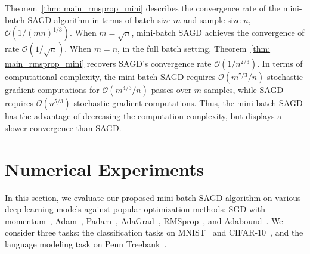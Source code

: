 \documentclass[11pt]{article}
\begin{document}
Theorem~\ref{thm: main_rmsprop_mini} 
describes the convergence rate of the mini-batch \textsc{SAGD} algorithm in terms of batch size $m$ and sample size $n$, \ie $\mathcal{O}(1/(mn)^{1/3})$.
When $m = \sqrt{n}$, mini-batch \textsc{SAGD} achieves the convergence of rate $\mathcal{O}(1/\sqrt{n})$. When $m=n$, \ie in the full batch setting, Theorem~\ref{thm: main_rmsprop_mini} recovers \textsc{SAGD}'s convergence rate  $\mathcal{O}(1/n^{2/3})$. 
In terms of computational complexity, the mini-batch \textsc{SAGD} requires $\mathcal{O}(m^{7/3}/n)$ stochastic gradient computations for $\mathcal{O}(m^{4/3}/n)$ passes over $m$ samples, while \textsc{SAGD} requires $\mathcal{O}(n^{5/3})$ stochastic gradient computations. 
Thus, the mini-batch \textsc{SAGD} has the advantage of decreasing the computation complexity, but displays a slower convergence than \textsc{SAGD}.

\vspace{-0.05in}
\section{Numerical Experiments} \label{sec: experiment}
\vspace{-0.05in}

In this section, we evaluate our proposed mini-batch \textsc{SAGD} algorithm on various deep learning models against popular optimization methods: SGD with momentum~\citep{qian1999momentum}, Adam~\citep{kiba15}, Padam~\citep{chgu2018},  AdaGrad~\citep{duha11},  RMSprop~\citep{tige12}, and Adabound~\citep{luxi2019}. 
We consider three tasks: the classification tasks on MNIST~\citep{lebo1998} and CIFAR-10~\citep{krhi2009}, and the language modeling task on Penn Treebank~\citep{mama1993}. 
\end{document}
